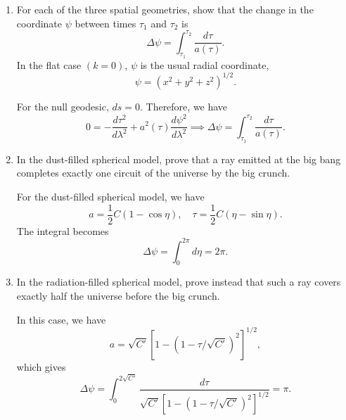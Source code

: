 \begin{enumerate}[label=\alph*)]
    \item For each of the three spatial geometries, show that the change in the
    coordinate $\psi$ between times $\tau_1$ and $\tau_2$ is
    \begin{equation}
        \Delta\psi=\int_{\tau_1}^{\tau_2}\frac{d\tau}{a(\tau)}.
    \end{equation}
    In the flat case $(k=0)$, $\psi$ is the usual radial coordinate,
    \begin{equation}
        \psi=(x^2+y^2+z^2)^{1/2}.
    \end{equation}
    \begin{solution}
        For the null geodesic, $ds = 0$. Therefore, we have
        \begin{equation}
            0 =-\frac{d\tau^2}{d\lambda^2} + a^2(\tau) \frac{d\psi^2}{d\lambda^2} \implies \Delta\psi = \int_{\tau_1}^{\tau_2}\frac{d\tau}{a(\tau)}.
        \end{equation}
    \end{solution}

    \item In the dust-filled spherical model, prove that a ray emitted at the big
    bang completes exactly one circuit of the universe by the big crunch.
    \begin{solution}
        For the dust-filled spherical model, we have
        \begin{equation}
            a =\frac{1}{2}C(1-\cos\eta), \quad \tau = \frac{1}{2}C(\eta - \sin \eta).
        \end{equation}
        The integral becomes
        \begin{equation}
            \Delta\psi = \int_0^{2\pi} d\eta = 2\pi.
        \end{equation}
    \end{solution}
    \item In the radiation-filled spherical model, prove instead that such a ray
    covers exactly half the universe before the big crunch.
    \begin{solution}
        In this case, we have
        \begin{equation}
            a = \sqrt{C'}[1-(1-\tau/\sqrt{C'})^2]^{1/2},
        \end{equation}
        which gives
        \begin{equation}
            \Delta \psi = \int ^{2\sqrt{C'}}_0 \frac{d\tau}{\sqrt{C'}[1-(1-\tau/\sqrt{C'})^2]^{1/2}} = \pi.
        \end{equation}
    \end{solution}
\end{enumerate}

